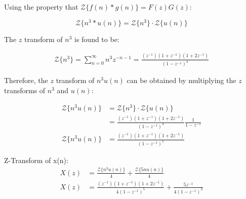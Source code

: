 \documentclass{article}
\begin{document}
Using the property that $\mathcal{Z}\{f(n) * g(n)\} = F(z)G(z)$:

\[ \mathcal{Z}\{n^3 * u(n)\} = \mathcal{Z}\{n^3\} \cdot \mathcal{Z}\{u(n)\} \]

The $z$ transform of $n^3$ is found to be:

\begin{align}
 \mathcal{Z}\{n^3\} = \sum_{n=0}^{\infty} n^3z^{-n-1} = \frac{(z^{-1})(1+z^{-1})(1+2z^{-1})}{(1-z^{-1})^4}
  \end{align}



Therefore, the $z$ transform of $n^3u(n)$ can be obtained by multiplying the $z$ transforms of $n^3$ and $u(n)$:

\begin{align}
\mathcal{Z}\{n^3u(n)\} &= \mathcal{Z}\{n^3\} \cdot \mathcal{Z}\{u(n)\} \nonumber\\
&= \frac{(z^{-1})(1+z^{-1})(1+2z^{-1})}{(1-z^{-1})^4} \frac{1}{1-z^{-1}}\nonumber \\
\mathcal{Z}\{n^3u(n)\}&= \frac{(z^{-1})(1+z^{-1})(1+2z^{-1})}{(1-z^{-1})^5} 
\end{align}

Z-Transform of x(n):
\begin{align}
X(z) &=  \frac{\mathcal{Z}\{n^3u(n)\}}{4}+ \frac{\mathcal{Z}\{5nu(n)\}}{4}\\
X(z)&= \frac{(z^{-1})(1+z^{-1})(1+2z^{-1})}{4(1-z^{-1})^5}+ \frac{5z^{-1}}{4(1-z^{-1})^3}
\end{align}
\end{document}
